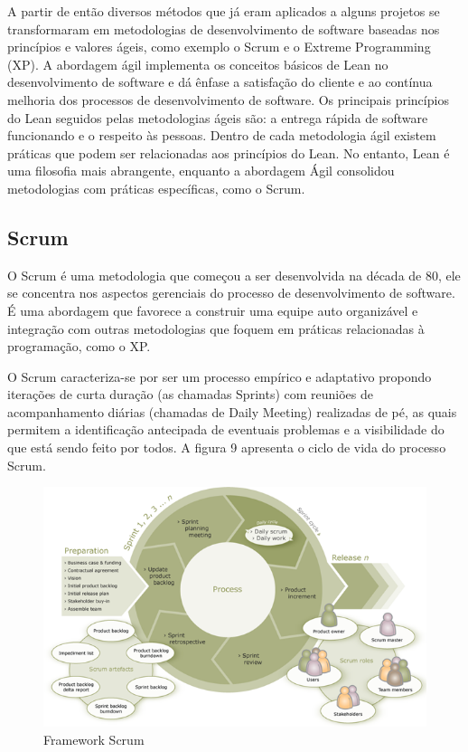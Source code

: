 A partir de então diversos métodos que já eram aplicados a alguns projetos se transformaram em metodologias de desenvolvimento de software baseadas nos princípios e valores ágeis, como exemplo o Scrum e o Extreme Programming (XP). A abordagem ágil implementa os conceitos básicos de Lean no desenvolvimento de software e dá ênfase a satisfação do cliente e ao contínua melhoria dos processos de desenvolvimento de software. Os principais princípios do Lean seguidos pelas metodologias ágeis são: a entrega rápida de software funcionando e o respeito às pessoas. Dentro de cada metodologia ágil existem práticas que podem ser relacionadas aos princípios do Lean. No entanto, Lean é uma filosofia mais abrangente, enquanto a abordagem Ágil consolidou metodologias com práticas específicas, como o Scrum. 

\subsection[Scrum]{Scrum}

O Scrum é uma metodologia que começou a ser desenvolvida na década de 80, ele se concentra nos aspectos gerenciais do processo de desenvolvimento de software. É uma abordagem que favorece a construir uma equipe auto organizável e integração com outras metodologias que foquem em práticas relacionadas à programação, como o XP. 

O Scrum caracteriza-se por ser um processo empírico e adaptativo propondo iterações de curta duração (as chamadas Sprints) com reuniões de acompanhamento diárias (chamadas de Daily Meeting) realizadas de pé, as quais permitem a identificação antecipada de eventuais problemas e a visibilidade do que está sendo feito por todos. A figura 9 apresenta o ciclo de vida do processo Scrum.

\begin{figure}[h]
		\centering
		\label{fig01}
			\includegraphics[scale=0.9]{figuras/scrum.png}
		\caption{Framework Scrum  \cite{scrumprocess}}
\end{figure}

